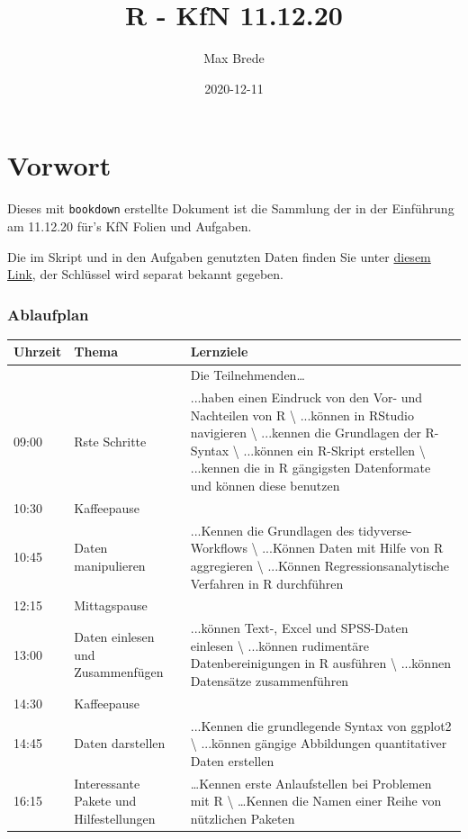 \documentclass[
]{book}
\title{R - KfN 11.12.20}
\author{Max Brede}
\date{2020-12-11}
\begin{document}
\maketitle

{
\setcounter{tocdepth}{1}
\tableofcontents
}
\hypertarget{vorwort}{%
\chapter{Vorwort}\label{vorwort}}

Dieses mit \texttt{bookdown} erstellte Dokument ist die Sammlung der in der Einführung am 11.12.20 für's KfN Folien und Aufgaben.

Die im Skript und in den Aufgaben genutzten Daten finden Sie unter \href{https://mega.nz/folder/k2A0WZAZ}{diesem Link}, der Schlüssel wird separat bekannt gegeben.

\hypertarget{ablaufplan}{%
\subsection{Ablaufplan}\label{ablaufplan}}

\begin{tabular}{l|l|l}
\hline
Uhrzeit & Thema & Lernziele\\
\hline
 &  & Die Teilnehmenden…\\
\hline
09:00 & Rste Schritte & ...haben einen Eindruck von den Vor- und Nachteilen von R \textbackslash{}
 ...können in RStudio navigieren \textbackslash{}
 ...kennen die Grundlagen der R-Syntax \textbackslash{}
 ...können ein R-Skript erstellen \textbackslash{}
 ...kennen die in R gängigsten Datenformate und können diese benutzen\\
\hline
10:30 & Kaffeepause & \\
\hline
10:45 & Daten manipulieren & ...Kennen die Grundlagen des tidyverse-Workflows \textbackslash{}
 ...Können Daten mit Hilfe von R aggregieren \textbackslash{}
 ...Können Regressionsanalytische Verfahren in R durchführen\\
\hline
12:15 & Mittagspause & \\
\hline
13:00 & Daten einlesen und Zusammenfügen & ...können Text-, Excel und SPSS-Daten einlesen \textbackslash{}
 ...können rudimentäre Datenbereinigungen in R ausführen \textbackslash{}
 ...können Datensätze zusammenführen\\
\hline
14:30 & Kaffeepause & \\
\hline
14:45 & Daten darstellen & ...Kennen die grundlegende Syntax von ggplot2 \textbackslash{}
 ...können gängige Abbildungen quantitativer Daten erstellen\\
\hline
16:15 & Interessante Pakete und Hilfestellungen & …Kennen erste Anlaufstellen bei Problemen mit R \textbackslash{}
 …Kennen die Namen einer Reihe von nützlichen Paketen\\
\hline
\end{tabular}
\end{document}
